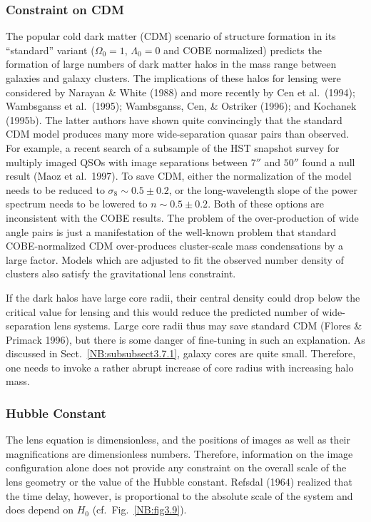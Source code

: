 \documentclass[a4paper,10pt]{article} %
\begin{document}
\subsubsection{Constraint on CDM}
\label{NB:subsubsect3.7.3}

The popular cold dark matter (CDM) scenario of structure formation in
its ``standard'' variant ($\Omega_0=1$, $\Lambda_0=0$ and COBE
normalized) predicts the formation of large numbers of dark matter
halos in the mass range between galaxies and galaxy clusters. The
implications of these halos for lensing were considered by Narayan \&
White (1988) and more recently by Cen et al.\ (1994); Wambsganss et
al.\ (1995); Wambsganss, Cen, \& Ostriker (1996); and Kochanek
(1995b). The latter authors have shown quite convincingly that the
standard CDM model produces many more wide-separation quasar pairs
than observed. For example, a recent search of a subsample of the HST
snapshot survey for multiply imaged QSOs with image separations
between $7''$ and $50''$ found a null result (Maoz et al.\ 1997). To
save CDM, either the normalization of the model needs to be reduced to
$\sigma_8\sim0.5\pm0.2$, or the long-wavelength slope of the power
spectrum needs to be lowered to $n\sim0.5\pm0.2$. Both of these
options are inconsistent with the COBE results. The problem of the
over-production of wide angle pairs is just a manifestation of the
well-known problem that standard COBE-normalized CDM over-produces
cluster-scale mass condensations by a large factor. Models which are
adjusted to fit the observed number density of clusters also satisfy
the gravitational lens constraint.

If the dark halos have large core radii, their central density could
drop below the critical value for lensing and this would reduce the
predicted number of wide-separation lens systems. Large core radii
thus may save standard CDM (Flores \& Primack 1996), but there is some
danger of fine-tuning in such an explanation. As discussed in Sect.\
\ref{NB:subsubsect3.7.1}, galaxy cores are quite small. Therefore, one
needs to invoke a rather abrupt increase of core radius with
increasing halo mass.

\subsubsection{Hubble Constant}
\label{NB:subsubsect3.7.4}

The lens equation is dimensionless, and the positions of images as
well as their magnifications are dimensionless numbers. Therefore,
information on the image configuration alone does not provide any
constraint on the overall scale of the lens geometry or the value of
the Hubble constant. Refsdal (1964) realized that the time delay,
however, is proportional to the absolute scale of the system and does
depend on $H_0$ (cf.\ Fig.\ \ref{NB:fig3.9}).
\end{document}
